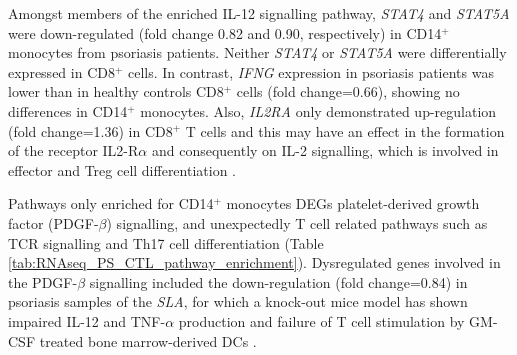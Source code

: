 
Amongst members of the enriched IL-12 signalling pathway, \textit{STAT4} and \textit{STAT5A} were down-regulated (fold change 0.82 and 0.90, respectively) in CD14$^+$ monocytes from psoriasis patients. Neither \textit{STAT4} or \textit{STAT5A} were differentially expressed in CD8$^+$ cells. In contrast, \textit{IFNG} expression in psoriasis patients was lower than in healthy controls CD8$^+$ cells (fold change=0.66), showing no differences in CD14$^+$ monocytes. Also, \textit{IL2RA} only demonstrated up-regulation (fold change=1.36) in CD8$^+$ T cells and this may have an effect in the formation of the receptor IL2-R$\alpha$ and consequently on IL-2 signalling, which is involved in effector and Treg cell differentiation \parencite{Malek2010}.

Pathways only enriched for CD14$^+$ monocytes DEGs platelet-derived growth factor (PDGF-$\beta$) signalling, and unexpectedly T cell related pathways such as TCR signalling and Th17 cell differentiation (Table \ref{tab:RNAseq_PS_CTL_pathway_enrichment}). Dysregulated genes involved in the PDGF-$\beta$ signalling included the down-regulation (fold change=0.84) in psoriasis samples of the \textit{SLA}, for which a knock-out mice model has shown impaired IL-12 and TNF-$\alpha$ production and failure of T cell stimulation by GM-CSF treated bone marrow-derived DCs \parencite{Liontos2011}.

